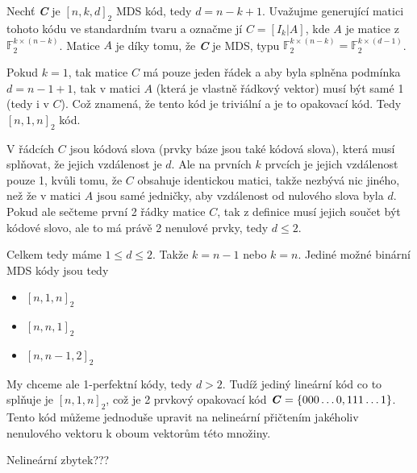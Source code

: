 \documentclass[12pt, a4paper]{article}
\begin{document}
\section{}
Nechť \textbf{\textit{C}} je $[n,k,d]_{2}$ MDS kód, tedy $d=n-k+1$. Uvažujme generující matici tohoto kódu ve standardním tvaru a označme jí $C = [I_{k}|A]$, kde $A$ je matice z $\mathbb{F}^{k \times (n-k)}_{2}$. Matice $A$ je díky tomu, že \textbf{\textit{C}} je MDS, typu $\mathbb{F}^{k \times (n-k)}_{2} = \mathbb{F}^{k \times (d-1)}_{2}$.



Pokud $k=1$, tak matice $C$ má pouze jeden řádek a aby byla splněna podmínka $d = n - 1 + 1$, tak v matici $A$ (která je vlastně řádkový vektor) musí být samé 1 (tedy i v $C$). Což znamená, že tento kód je triviální a je to opakovací kód. Tedy $[n,1,n]_{2}$ kód.

 V řádcích $C$ jsou kódová slova (prvky báze jsou také kódová slova), která musí splňovat, že jejich vzdálenost je $d$. Ale na prvních $k$ prvcích je jejich vzdálenost pouze 1, kvůli tomu, že $C$ obsahuje identickou matici, takže nezbývá nic jiného, než že v matici $A$ jsou samé jedničky, aby vzdálenost od nulového slova byla $d$. Pokud ale sečteme první 2 řádky matice $C$, tak z definice musí jejich součet být kódové slovo, ale to má právě 2 nenulové prvky, tedy $d \leq 2$.

Celkem tedy máme $1 \leq d \leq 2$. Takže $k = n-1$ nebo $k = n$. Jediné možné binární MDS kódy jsou tedy
\begin{itemize}
    \item $[n,1,n]_{2}$
    \item $[n,n,1]_{2}$
    \item $[n,n-1,2]_{2}$
\end{itemize}

My chceme ale 1-perfektní kódy, tedy $d > 2$. Tudíž jediný lineární kód co to splňuje je $[n,1,n]_{2}$, což je 2 prvkový opakovací kód $\textbf{\textit{C}}=\{000\dots0, 111\dots1\}$. Tento kód můžeme jednoduše upravit na nelineární přičtením jakéholiv nenulového vektoru k oboum vektorům této množiny.

Nelineární zbytek???
\end{document}
